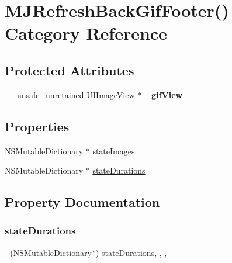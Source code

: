 \hypertarget{category_m_j_refresh_back_gif_footer_07_08}{}\section{M\+J\+Refresh\+Back\+Gif\+Footer() Category Reference}
\label{category_m_j_refresh_back_gif_footer_07_08}
\subsection*{Protected Attributes}
\begin{DoxyCompactItemize}
\item 
\mbox{\label{category_m_j_refresh_back_gif_footer_07_08_a6cc1be8a5f70694f067bf5e8de7ba3f3}} 
\+\_\+\+\_\+unsafe\+\_\+unretained U\+I\+Image\+View $\ast$ {\bfseries \+\_\+gif\+View}
\end{DoxyCompactItemize}
\subsection*{Properties}
\begin{DoxyCompactItemize}
\item 
N\+S\+Mutable\+Dictionary $\ast$ \mbox{\hyperlink{category_m_j_refresh_back_gif_footer_07_08_a0446f85ecbe3680e9d3be3be84157881}{state\+Images}}
\item 
N\+S\+Mutable\+Dictionary $\ast$ \mbox{\hyperlink{category_m_j_refresh_back_gif_footer_07_08_a919a00927ed9e2b375195a3aaa4ac4d6}{state\+Durations}}
\end{DoxyCompactItemize}


\subsection{Property Documentation}
\mbox{\label{category_m_j_refresh_back_gif_footer_07_08_a919a00927ed9e2b375195a3aaa4ac4d6}} 
\subsubsection{\texorpdfstring{state\+Durations}{stateDurations}}
{\footnotesize\ttfamily -\/ (N\+S\+Mutable\+Dictionary$\ast$) state\+Durations\hspace{0.3cm}{\ttfamily [read]}, {\ttfamily [write]}, {\ttfamily [nonatomic]}, {\ttfamily [strong]}}


